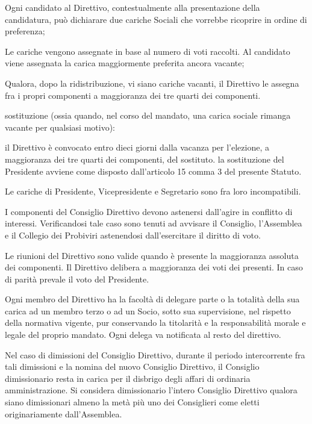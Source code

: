 \documentclass[legalpaper, 11pt]{exam}
\let\tempone\enumerate
\let\temptwo\endenumerate
\renewenvironment{enumerate}{\tempone\addtolength{\itemsep}{-0.45\baselineskip}}{\temptwo}
\begin{document}
{\begin{enumerate}
\begin{enumerate}
   \begin{enumerate}
	\item Ogni candidato al Direttivo, contestualmente alla presentazione della candidatura, può dichiarare due cariche Sociali che vorrebbe ricoprire in ordine di preferenza;
	\item Le cariche vengono assegnate in base al numero di voti raccolti. Al candidato viene assegnata la carica maggiormente preferita ancora vacante;
	\item Qualora, dopo la ridistribuzione, vi siano cariche vacanti, il Direttivo le assegna fra i	propri componenti a maggioranza dei tre quarti dei componenti.
   \end{enumerate}
   \item sostituzione (ossia quando, nel corso del mandato, una carica sociale rimanga vacante per qualsiasi motivo): 
   \begin{enumerate}
	\item il Direttivo è convocato entro dieci giorni dalla vacanza per l’elezione, a maggioranza dei tre quarti dei componenti, del sostituto. la sostituzione del Presidente avviene come disposto dall’articolo 15 comma 3 del presente Statuto.
   \end{enumerate}
\end{enumerate}
\item Le cariche di Presidente, Vicepresidente e Segretario sono fra loro incompatibili.
\item I componenti del Consiglio Direttivo devono astenersi dall’agire in conflitto di interessi. Verificandosi tale caso sono tenuti ad avvisare il Consiglio, l’Assemblea e il Collegio dei Probiviri astenendosi dall’esercitare il diritto di voto.
\item Le riunioni del Direttivo sono valide quando è presente la maggioranza assoluta dei componenti. Il Direttivo delibera a maggioranza dei voti dei presenti. In caso di parità prevale il voto del Presidente.
\item Ogni membro del Direttivo ha la facoltà di delegare parte o la totalità della sua carica ad un membro terzo o ad un Socio, sotto sua supervisione, nel rispetto della normativa vigente, pur conservando la titolarità e la responsabilità morale e legale del proprio mandato. Ogni delega va notificata al resto del direttivo.
\item Nel caso di dimissioni del Consiglio Direttivo, durante il periodo intercorrente fra tali dimissioni e la nomina del nuovo Consiglio Direttivo, il Consiglio dimissionario resta in carica per il disbrigo degli affari di ordinaria amministrazione. Si considera dimissionario l’intero Consiglio Direttivo qualora siano dimissionari almeno la metà più uno dei Consiglieri come eletti originariamente dall’Assemblea.

\end{enumerate}}
\end{document}
